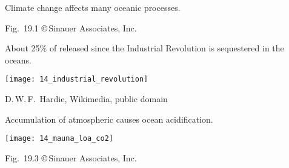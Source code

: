 \documentclass[t]{beamer}
\begin{document}

{
\begin{frame}[b]{Climate change affects many oceanic processes.}

	\tiny Fig.~19.1 \copyright\,Sinauer Associates, Inc.
\end{frame}
}
%
\begin{frame}{About 25\% of  released since the Industrial Revolution is sequestered in the oceans.}

	\texttt{[image: 14\_industrial\_revolution]}
	
	\vfilll \tiny D.\,W.\,F.~Hardie, Wikimedia, public domain
	
	
\end{frame}
%
\begin{frame}[t]{Accumulation of atmospheric  causes ocean acidification.}

	\texttt{[image: 14\_mauna\_loa\_co2]}
	
	\vfilll

	\hfill \tiny Fig.~19.3 \copyright\,Sinauer Associates, Inc.
	
\end{frame}
%
%
%	
%	
%	
%
%
%	
%
\end{document}
